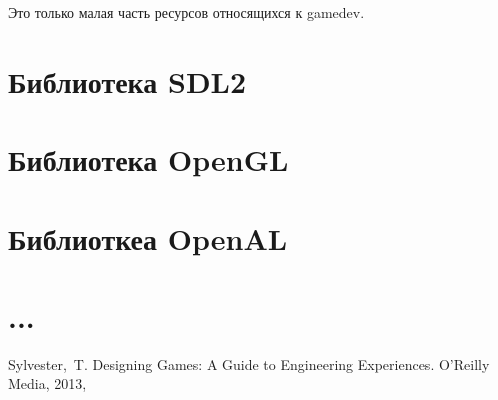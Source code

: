 Это только малая часть ресурсов относящихся к gamedev.

\section{Библиотека SDL2}
\section{Библиотека OpenGL}
\section{Библиоткеа OpenAL}
\section{...}

\renewcommand{\bibname}{Список используемой литературы}
\begin{thebibliography}{10}
     Sylvester,~T. Designing Games: A Guide to Engineering Experiences. O'Reilly Media, 2013, 
\end{thebibliography}
